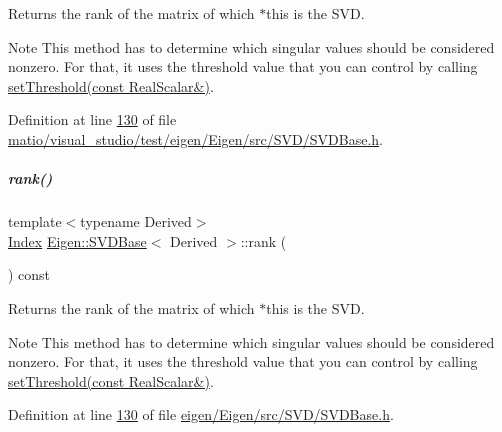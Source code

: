\begin{DoxyReturn}{Returns}
the rank of the matrix of which {\ttfamily $\ast$this} is the S\+VD.
\end{DoxyReturn}
\begin{DoxyNote}{Note}
This method has to determine which singular values should be considered nonzero. For that, it uses the threshold value that you can control by calling \hyperlink{group___s_v_d___module_a1c95d05398fc15e410a28560ef70a5a6}{set\+Threshold(const Real\+Scalar\&)}. 
\end{DoxyNote}


Definition at line \hyperlink{matio_2visual__studio_2test_2eigen_2_eigen_2src_2_s_v_d_2_s_v_d_base_8h_source_l00130}{130} of file \hyperlink{matio_2visual__studio_2test_2eigen_2_eigen_2src_2_s_v_d_2_s_v_d_base_8h_source}{matio/visual\+\_\+studio/test/eigen/\+Eigen/src/\+S\+V\+D/\+S\+V\+D\+Base.\+h}.

\mbox{\label{group___s_v_d___module_a30b89e24f42f1692079eea31b361d26a}} 
\subparagraph{\texorpdfstring{rank()}{rank()}\hspace{0.1cm}{\footnotesize\ttfamily [2/2]}}
{\footnotesize\ttfamily template$<$typename Derived$>$ \\
\hyperlink{group___s_v_d___module_a6229a37997eca1072b52cca5ee7a2bec}{Index} \hyperlink{group___s_v_d___module_class_eigen_1_1_s_v_d_base}{Eigen\+::\+S\+V\+D\+Base}$<$ Derived $>$\+::rank (\begin{DoxyParamCaption}{ }\end{DoxyParamCaption}) const\hspace{0.3cm}{\ttfamily [inline]}}

\begin{DoxyReturn}{Returns}
the rank of the matrix of which {\ttfamily $\ast$this} is the S\+VD.
\end{DoxyReturn}
\begin{DoxyNote}{Note}
This method has to determine which singular values should be considered nonzero. For that, it uses the threshold value that you can control by calling \hyperlink{group___s_v_d___module_a1c95d05398fc15e410a28560ef70a5a6}{set\+Threshold(const Real\+Scalar\&)}. 
\end{DoxyNote}


Definition at line \hyperlink{eigen_2_eigen_2src_2_s_v_d_2_s_v_d_base_8h_source_l00130}{130} of file \hyperlink{eigen_2_eigen_2src_2_s_v_d_2_s_v_d_base_8h_source}{eigen/\+Eigen/src/\+S\+V\+D/\+S\+V\+D\+Base.\+h}.

